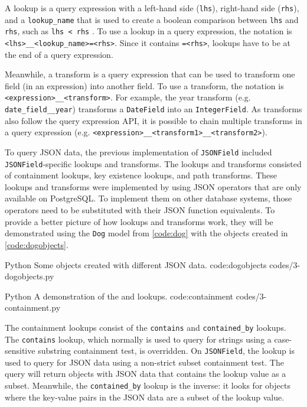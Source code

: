 A lookup is a query expression with a left-hand side (\verb|lhs|), right-hand
side (\verb|rhs|), and a \verb|lookup_name| that is used to create a boolean
comparison between \verb|lhs| and \verb|rhs|, such as \verb|lhs < rhs|
\cite{django:lookups}. To use a lookup in a query expression, the notation is
\verb|<lhs>__<lookup_name>=<rhs>|. Since it contains \verb|=<rhs>|, lookups
have to be at the end of a query expression.

Meanwhile, a transform is a query expression that can be used to transform one
field (in an expression) into another field. To use a transform, the notation
is \verb|<expression>__<transform>|. For example, the year transform (e.g.
\verb|date_field__year|) transforms a \verb|DateField| into an
\verb|IntegerField|. As transforms also follow the query expression API, it is
possible to chain multiple transforms in a query expression (e.g.
\verb|<expression>__<transform1>__<transform2>|).

To query JSON data, the previous implementation of \verb|JSONField| included
\verb|JSONField|-specific lookups and transforms. The lookups and transforms
consisted of containment lookups, key existence lookups, and path transforms.
These lookups and transforms were implemented by using JSON operators that are
only available on PostgreSQL. To implement them on other database systems,
those operators need to be substituted with their JSON function equivalents. To
provide a better picture of how lookups and transforms work, they will be
demonstrated using the \verb|Dog| model from \autoref{code:dog} with the
objects created in
\autoref{code:dogobjects}.

\listing
{Python}
{Some  objects created with different JSON data.}
{code:dogobjects}
{codes/3-dogobjects.py}

\listing
{Python}
{A demonstration of the  and  lookups.}
{code:containment}
{codes/3-containment.py}

The containment lookups consist of the \verb|contains| and \verb|contained_by|
lookups. The \verb|contains| lookup, which normally is used to query for
strings using a case-sensitive substring containment test, is overridden. On
\verb|JSONField|, the lookup is used to query for JSON data using a non-strict
subset containment test. The query will return objects with JSON data that
contains the lookup value as a subset. Meanwhile, the \verb|contained_by|
lookup is the inverse: it looks for objects where the key-value pairs in the
JSON data are a subset of the lookup value.

